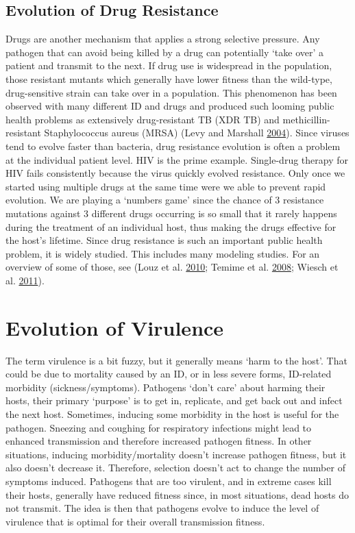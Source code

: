 \documentclass[]{book}
\theoremstyle{definition}
\theoremstyle{definition}
\theoremstyle{definition}
\theoremstyle{remark}
\begin{document}
\subsection{Evolution of Drug
Resistance}\label{evolution-of-drug-resistance}

Drugs are another mechanism that applies a strong selective pressure.
Any pathogen that can avoid being killed by a drug can potentially `take
over' a patient and transmit to the next. If drug use is widespread in
the population, those resistant mutants which generally have lower
fitness than the wild-type, drug-sensitive strain can take over in a
population. This phenomenon has been observed with many different ID and
drugs and produced such looming public health problems as extensively
drug-resistant TB (XDR TB) and methicillin-resistant Staphylococcus
aureus (MRSA) (Levy and Marshall \protect\hyperlink{ref-levy04}{2004}).
Since viruses tend to evolve faster than bacteria, drug resistance
evolution is often a problem at the individual patient level. HIV is the
prime example. Single-drug therapy for HIV fails consistently because
the virus quickly evolved resistance. Only once we started using
multiple drugs at the same time were we able to prevent rapid evolution.
We are playing a `numbers game' since the chance of 3 resistance
mutations against 3 different drugs occurring is so small that it rarely
happens during the treatment of an individual host, thus making the
drugs effective for the host's lifetime. Since drug resistance is such
an important public health problem, it is widely studied. This includes
many modeling studies. For an overview of some of those, see (Louz et
al. \protect\hyperlink{ref-louz10}{2010}; Temime et al.
\protect\hyperlink{ref-temime08}{2008}; Wiesch et al.
\protect\hyperlink{ref-wiesch11}{2011}).

\section{Evolution of Virulence}\label{evolution-of-virulence}

The term virulence is a bit fuzzy, but it generally means `harm to the
host'. That could be due to mortality caused by an ID, or in less severe
forms, ID-related morbidity (sickness/symptoms). Pathogens `don't care'
about harming their hosts, their primary `purpose' is to get in,
replicate, and get back out and infect the next host. Sometimes,
inducing some morbidity in the host is useful for the pathogen. Sneezing
and coughing for respiratory infections might lead to enhanced
transmission and therefore increased pathogen fitness. In other
situations, inducing morbidity/mortality doesn't increase pathogen
fitness, but it also doesn't decrease it. Therefore, selection doesn't
act to change the number of symptoms induced. Pathogens that are too
virulent, and in extreme cases kill their hosts, generally have reduced
fitness since, in most situations, dead hosts do not transmit. The idea
is then that pathogens evolve to induce the level of virulence that is
optimal for their overall transmission fitness.
\end{document}
